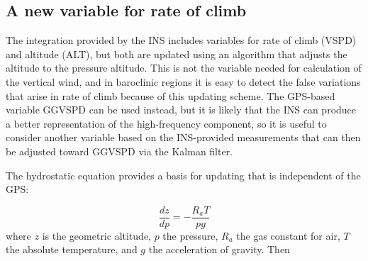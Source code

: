 \documentclass[12pt,twoside,english,12pt,twoside,english]{article}\usepackage[]{graphicx}\usepackage[]{color}
\let\OrgIndex\index
\renewcommand*{\index}[1]{\OrgIndex{#1}}
\begin{document}
\subsection{A new variable for rate of climb\label{subsec:ROC}}



The integration provided by
the INS includes variables for
rate of climb (VSPD)
and altitude (ALT),
but both are updated using an algorithm that adjusts the altitude
to the pressure altitude. This is not the variable needed for calculation
of the vertical wind, and in baroclinic
regions it is easy to detect the false variations that arise in rate
of climb because of this updating scheme. The GPS-based
variable GGVSPD
can be used instead, but it is likely that the INS can produce a better
representation of the high-frequency component, so it is useful to
consider another variable based on the INS-provided measurements
that can then be adjusted toward GGVSPD via the Kalman filter. 

The hydrostatic equation provides a basis
for updating that is independent of the GPS: 

\begin{equation}
\frac{dz}{dp}=-\frac{R_{a}T}{pg}\label{eq:hydrostatic-equation}
\end{equation}
where $z$ is the geometric altitude,
$p$ the pressure, $R_{a}$ the gas constant
for air, $T$ the absolute temperature, and $g$
the acceleration of gravity.
Then 
\end{document}
